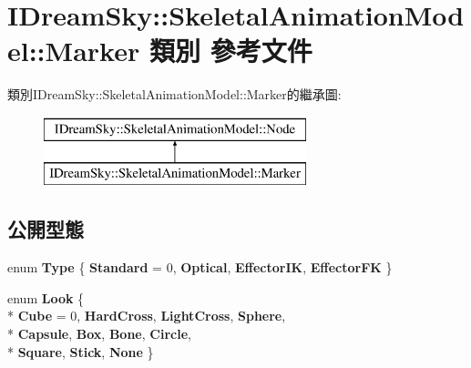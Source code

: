 \hypertarget{class_i_dream_sky_1_1_skeletal_animation_model_1_1_marker}{}\section{I\+Dream\+Sky\+:\+:Skeletal\+Animation\+Model\+:\+:Marker 類別 參考文件}
\label{class_i_dream_sky_1_1_skeletal_animation_model_1_1_marker}
類別\+I\+Dream\+Sky\+:\+:Skeletal\+Animation\+Model\+:\+:Marker的繼承圖\+:\begin{figure}[H]
\begin{center}
\leavevmode
\includegraphics[height=2.000000cm]{class_i_dream_sky_1_1_skeletal_animation_model_1_1_marker}
\end{center}
\end{figure}
\subsection*{公開型態}
\begin{DoxyCompactItemize}
\item 
enum {\bfseries Type} \{ {\bfseries Standard} = 0, 
{\bfseries Optical}, 
{\bfseries Effector\+IK}, 
{\bfseries Effector\+FK}
 \}\hypertarget{class_i_dream_sky_1_1_skeletal_animation_model_1_1_marker_aea5b39ed15ddc992e4be55bf07f8ed3b}{}\label{class_i_dream_sky_1_1_skeletal_animation_model_1_1_marker_aea5b39ed15ddc992e4be55bf07f8ed3b}

\item 
enum {\bfseries Look} \{ \\*
{\bfseries Cube} = 0, 
{\bfseries Hard\+Cross}, 
{\bfseries Light\+Cross}, 
{\bfseries Sphere}, 
\\*
{\bfseries Capsule}, 
{\bfseries Box}, 
{\bfseries Bone}, 
{\bfseries Circle}, 
\\*
{\bfseries Square}, 
{\bfseries Stick}, 
{\bfseries None}
 \}\hypertarget{class_i_dream_sky_1_1_skeletal_animation_model_1_1_marker_af82b4ae9ac488abe7c211fe7c1ee4818}{}\label{class_i_dream_sky_1_1_skeletal_animation_model_1_1_marker_af82b4ae9ac488abe7c211fe7c1ee4818}

\end{DoxyCompactItemize}
